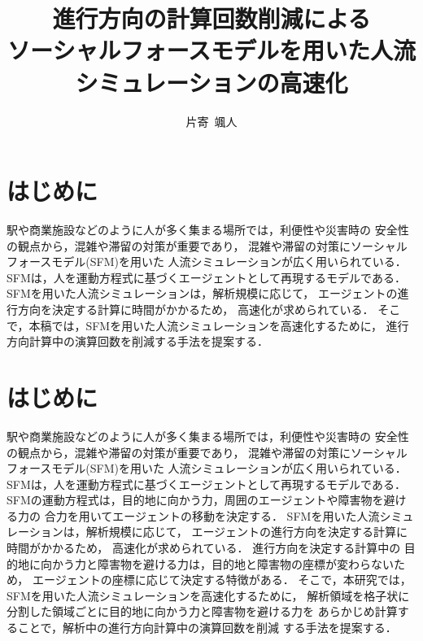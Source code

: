 \documentclass{maelab_y}
\newcommand{\分類条件}{
\begin{table}[t]
\begin{center}
\caption{進行方向を分類する条件}
\ecaption{Classification condition of moving direction $e_{i}$.}
\label{tb:hantei_jouken}
\begin{tabular}{c|c|c|c|c}
\hline \hline
			& 右 & 左 & 上 & 下 \\ \hline
パターン2   & $\frac{1}{\sqrt{2}} < e_x \leq 1  $
		    & $ -1 \leq e_x < \frac{-1}{\sqrt{2}}$ 
		    & $ \frac{-1}{\sqrt{2}} < e_x < \frac{1}{\sqrt{2}} $ 
		    & $ \frac{-1}{2} < e_x < \frac{1}{2} $ \\
パターン3   & $\frac{-1}{2} < e_y < \frac{1}{2} $ 
		    & $\frac{-1}{2} < e_y < \frac{1}{2} $
            & $ \frac{1}{\sqrt{2}} < e_y \leq 1$
		    & $ -1 \leq e_y < \frac{-1}{\sqrt{2}} $ \\
\hline
\multirow{2}{*}{パターン4}   
			& $R_x \geq A_x$ & $R_x < A_x$ & $R_y \geq A_y$ & $R_y < A_y $ \\
	        &  $L_x \geq A_x$ & $L_x < A_x$ & $L_y \geq A_y$ & $L_y < A_y$ \\
\hline
\multirow{2}{*}{パターン5}   
 			& $R_x \geq x_1$ & $R_x < x_2$ & $R_y \geq y_1$ & $R_y < y_2 $ \\
			& $L_x \geq x_1$ & $L_x < x_2$ & $L_y \geq y_1$ & $L_y < y_2 $ \\
\hline
パターン6   & $ \cos(\frac{1}{2}\theta_{view}) \leq  e_y $ 
			& $ e_y \leq -\cos(\frac{1}{2}\theta_{view})$ 
			& $ \sin(\frac{1}{2}(\pi - \theta_{view})) \leq e_x $ 
			& $ e_x \leq \sin(\frac{1}{2}(\pi - \theta_{view}))  $ \\
\hline
\end{tabular}
\end{center}
\end{table}}
\newcommand{\距離計算new}{
  \begin{table}[]
    \caption{エージェント間距離の計算回数[$10^{10}$回]}
    \label{tab:my-table}
    \begin{tabular}{c|llllll}
    \hline
    \multirow{2}{*}{人数}   & \multicolumn{6}{c}{パターン}                                                                                                                                                              \\ \cline{2-7} 
                          & \multicolumn{1}{c|}{1}    & \multicolumn{1}{c|}{2}               & \multicolumn{1}{c|}{3}      & \multicolumn{1}{c|}{4}      & \multicolumn{1}{c|}{5}      & \multicolumn{1}{c}{6}    \\ \hline
    \multirow{2}{*}{3000} & \multicolumn{1}{r|}{5.1}  & \multicolumn{1}{r|}{\textbf{3.9}}    & \multicolumn{1}{r|}{4.0}    & \multicolumn{1}{r|}{4.4}    & \multicolumn{1}{r|}{4.1}    & \multicolumn{1}{r}{4.4}  \\
                          & \multicolumn{1}{l|}{}     & \multicolumn{1}{l|}{\textbf{(24\%)}} & \multicolumn{1}{l|}{(23\%)} & \multicolumn{1}{l|}{(15\%)} & \multicolumn{1}{l|}{(21\%)} & (15\%)                   \\ \hline
    \multirow{2}{*}{5000} & \multicolumn{1}{r|}{14.4} & \multicolumn{1}{r|}{\textbf{10.9}}   & \multicolumn{1}{r|}{11.1}   & \multicolumn{1}{r|}{12.2}   & \multicolumn{1}{r|}{11.4}   & \multicolumn{1}{r}{12.2} \\
                          & \multicolumn{1}{l|}{}     & \multicolumn{1}{l|}{\textbf{(24\%)}} & \multicolumn{1}{l|}{(23\%)} & \multicolumn{1}{l|}{(15\%)} & \multicolumn{1}{l|}{(21\%)} & (15\%)                   \\ \hline
    \multirow{2}{*}{7500} & \multicolumn{1}{r|}{33.1} & \multicolumn{1}{r|}{\textbf{25.2}}   & \multicolumn{1}{r|}{25.8}   & \multicolumn{1}{r|}{28.3}   & \multicolumn{1}{r|}{26.7}   & \multicolumn{1}{r}{28.3} \\
                          & \multicolumn{1}{l|}{}     & \multicolumn{1}{l|}{\textbf{(24\%)}} & \multicolumn{1}{l|}{(22\%)} & \multicolumn{1}{l|}{(15\%)} & \multicolumn{1}{l|}{(20\%)} & (15\%)                   \\ \hline
    \end{tabular}
    \end{table}
}
\newcommand{\距離計算回数}{
\begin{table}[hbtp]
\begin{center}
\caption{エージェント間距離の計算回数[$10^{10}$回]}
\label{tb:count_result_yobi}
\begin{tabular}{c|r|r|r|r|r|r}
\hline \hline
	人数 & 1 & 2 & 3 & 4 & 5 & 6 \\  
	\hline
	\multirow{2}{*}{3000} 
	& 5.1   & $\mathbf{3.9}$   & 4.0    & 4.4    & 4.1    & 4.4   \\  
	&       & ($\mathbf{24.5}$\%) 					& (22.9\%) & (15.3\%) & (20.7\%) & (15.2\%) \\ \hline
	\multirow{2}{*}{5000} 
	& 14.4  &  $\mathbf{10.9}$  					  & 11.1   & 12.2   & 11.4   & 12.2  \\  
	&       & ($\mathbf{23.8}$\%) 					& (22.6\%) & (15.2\%) & (20.5\%) & (15.1\%) \\ \hline
	\multirow{2}{*}{7500} 
	& 33.1  & $\mathbf{25.2}$	 		    	 	 & 25.8   & 28.3   & 26.7   & 28.3  \\ 
	&       & ($\mathbf{23.9}$\%) 					& (22.2\%) & (14.6\%) & (19.4\%) & (14.6\%) \\ \hline
    \end{tabular}
  \end{center}
\end{table}}
\begin{document}
\title{進行方向の計算回数削減による
\\ソーシャルフォースモデルを用いた人流シミュレーションの高速化}
\author{片寄\ 颯人}
\maketitle

\section{はじめに}
駅や商業施設などのように人が多く集まる場所では，利便性や災害時の
安全性の観点から，混雑や滞留の対策が重要であり，
混雑や滞留の対策にソーシャルフォースモデル(SFM)を用いた
人流シミュレーションが広く用いられている\cite{helbing_sfm}．
SFMは，人を運動方程式に基づくエージェントとして再現するモデルである．
SFMを用いた人流シミュレーションは，解析規模に応じて，
エージェントの進行方向を決定する計算に時間がかかるため，
高速化が求められている．
そこで，本稿では，SFMを用いた人流シミュレーションを高速化するために，
進行方向計算中の演算回数を削減する手法を提案する．
\fi

\section{はじめに}
駅や商業施設などのように人が多く集まる場所では，利便性や災害時の
安全性の観点から，混雑や滞留の対策が重要であり，
混雑や滞留の対策にソーシャルフォースモデル(SFM)を用いた
人流シミュレーションが広く用いられている\cite{helbing_sfm}．
SFMは，人を運動方程式に基づくエージェントとして再現するモデルである．
SFMの運動方程式は，目的地に向かう力，周囲のエージェントや障害物を避ける力の
合力を用いてエージェントの移動を決定する．
SFMを用いた人流シミュレーションは，解析規模に応じて，
エージェントの進行方向を決定する計算に時間がかかるため，
高速化が求められている．
進行方向を決定する計算中の
目的地に向かう力と障害物を避ける力は，目的地と障害物の座標が変わらないため，
エージェントの座標に応じて決定する特徴がある．
そこで，本研究では，SFMを用いた人流シミュレーションを高速化するために，
解析領域を格子状に分割した領域ごとに目的地に向かう力と障害物を避ける力を
あらかじめ計算することで，解析中の進行方向計算中の演算回数を削減
する手法を提案する．
\end{document}

